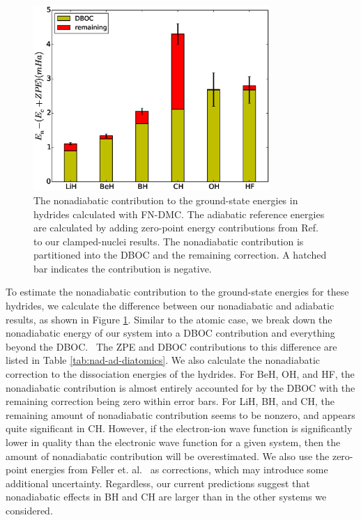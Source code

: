 \begin{figure}[h]
\centering
\includegraphics[width=0.8\textwidth]{dia-nad-ad}
\caption{The nonadiabatic contribution to the ground-state energies in hydrides calculated with FN-DMC. The adiabatic reference energies are calculated by adding zero-point energy contributions from Ref.~\cite{Feller_Corrections} to our clamped-nuclei results. The nonadiabatic contribution is partitioned into the DBOC and the remaining correction. A hatched bar indicates the contribution is negative. \label{fig:dia-nad-ad}}
\end{figure}

To estimate the nonadiabatic contribution to the ground-state energies for these hydrides, we calculate the difference between our nonadiabatic and adiabatic results, as shown in Figure \ref{fig:dia-nad-ad}. Similar to the atomic case, we break down the nonadiabatic energy of our system into a DBOC contribution and everything beyond the DBOC.~\cite{CFOUR,Harding,Feller_DBOC} The ZPE and DBOC contributions to this difference are listed in Table \ref{tab:nad-ad-diatomics}. We also calculate the nonadiabatic correction to the dissociation energies of the hydrides.
For BeH, OH, and HF, the nonadiabatic contribution is almost entirely accounted for by the DBOC with the remaining correction being zero within error bars. For LiH, BH, and CH, the remaining amount of nonadiabatic contribution seems to be nonzero, and appears quite significant in CH. However, if the electron-ion wave function is significantly lower in quality than the electronic wave function for a given system, then the amount of nonadiabatic contribution will be overestimated. We also use the zero-point energies from Feller et. al.~\cite{Feller_Corrections} as corrections, which may introduce some additional uncertainty.  Regardless, our current predictions suggest that nonadiabatic effects in BH and CH are larger than in the other systems we considered.

